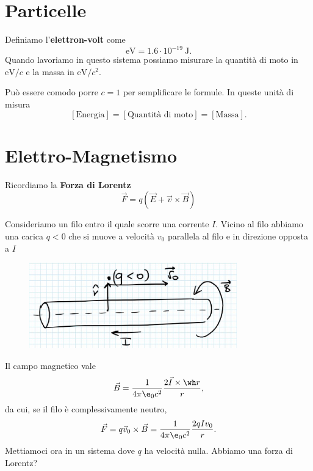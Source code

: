 \section{Particelle}

\begin{definition}
Definiamo l'\textbf{elettron-volt} come
\[\mathrm{eV}=1.6\cdot 10^{-19}\ \mathrm{J}.\]
Quando lavoriamo in questo sistema possiamo misurare la quantit\`a di moto in $\mathrm{eV}/c$ e la massa in $\mathrm{eV}/c^2$.
\end{definition}


\begin{definition}
Pu\`o essere comodo porre $c=1$ per semplificare le formule. In queste unit\`a di misura
\[[\text{Energia}]=[\text{Quantit\`a di moto}]=[\text{Massa}].\]
\end{definition}






\section{Elettro-Magnetismo}
Ricordiamo la \textbf{Forza di Lorentz}
\[\vec F=q(\vec E+\vec v\times \vec B)\]

\begin{example}
Consideriamo un filo entro il quale scorre una corrente $I$. Vicino al filo abbiamo una carica $q<0$ che si muove a velocit\`a $v_0$ parallela al filo e in direzione opposta a $I$

\begin{figure}[!htb]
    \centering
    \includegraphics[width=9cm]{images/Filo_e_carica.png}
\end{figure}

\noindent
Il campo magnetico vale
\[\vec B=\frac1{4\pi \e_0c^2}\frac{2 \vec I\times \wh r}r,\]
da cui, se il filo \`e complessivamente neutro,
\[\vec F=q\vec v_0\times \vec B=\frac1{4\pi \e_0c^2}\frac{2 qIv_0}r.\]
Mettiamoci ora in un sistema dove $q$ ha velocit\`a nulla. Abbiamo una forza di Lorentz?
\end{example}














